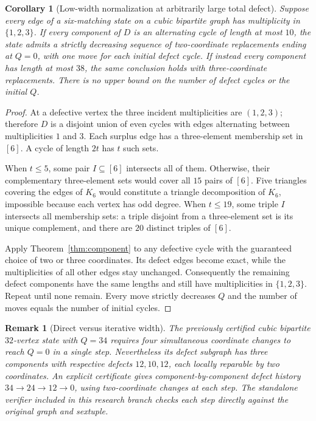 \documentclass[11pt]{article}
\newtheorem{corollary}[theorem]{Corollary}
\newtheorem{remark}[theorem]{Remark}
\begin{document}
\begin{corollary}[Low-width normalization at arbitrarily large total defect]
\label{cor:short-cycles}
Suppose every edge of a six-matching state on a cubic bipartite graph has
multiplicity in $\{1,2,3\}$. If every component of $D$ is an alternating
cycle of length at most $10$, the state admits a strictly decreasing sequence
of \emph{two-coordinate} replacements ending at $Q=0$, with one move for each
initial defect cycle. If instead every component has length at most $38$,
the same conclusion holds with \emph{three-coordinate} replacements.
There is no upper bound on the number of defect cycles or the initial $Q$.
\end{corollary}
\begin{proof}
At a defective vertex the three incident multiplicities are $(1,2,3)$;
therefore $D$ is a disjoint union of even cycles with edges alternating
between multiplicities $1$ and $3$. Each surplus edge has a three-element
membership set in $[6]$. A cycle of length $2t$ has $t$ such sets.

When $t\le5$, some pair $I\subseteq[6]$ intersects all of them. Otherwise,
their complementary three-element sets would cover all $15$ pairs of $[6]$.
Five triangles covering the edges of $K_6$ would constitute a triangle
decomposition of $K_6$, impossible because each vertex has odd degree.
When $t\le19$, some triple $I$ intersects all membership sets: a triple
disjoint from a three-element set is its unique complement, and there are
$20$ distinct triples of $[6]$.

Apply Theorem~\ref{thm:component} to any defective cycle with the guaranteed
choice of two or three coordinates. Its defect edges become exact, while
the multiplicities of all other edges stay unchanged. Consequently the
remaining defect components have the same lengths and still have
multiplicities in $\{1,2,3\}$. Repeat until none remain. Every move strictly
decreases $Q$ and the number of moves equals the number of initial cycles.
\end{proof}

\begin{remark}[Direct versus iterative width]
The previously certified cubic bipartite $32$-vertex state with $Q=34$ requires
four simultaneous coordinate changes to reach $Q=0$ in a single step.
Nevertheless its defect subgraph has three components with respective
defects $12,10,12$, each locally reparable by two coordinates. An explicit
certificate gives component-by-component defect history
$34\to24\to12\to0$, using two-coordinate changes at each step.
The standalone verifier included in this research branch checks each step
directly against the original graph and sextuple.
\end{remark}
\end{document}
